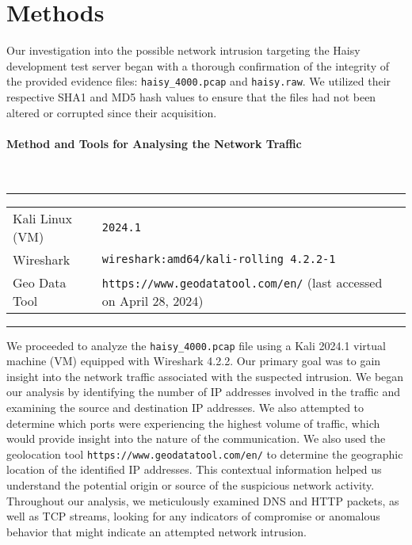 \section{Methods}
Our investigation into the possible network intrusion targeting the Haisy development test server began with a thorough confirmation of the integrity of the provided evidence files: \texttt{haisy\_4000.pcap} and \texttt{haisy.raw}. We utilized their respective SHA1 and MD5 hash values to ensure that the files had not been altered or corrupted since their acquisition.

\paragraph{Method and Tools for Analysing the Network Traffic}\mbox{}\\
\noindent\rule{\textwidth}{1pt}
\vspace{-0.8cm}
\begin{table}[h]
\begin{tabular}{ll}
Kali Linux (VM) & \texttt{2024.1}                                 \\
Wireshark      & \texttt{wireshark:amd64/kali-rolling 4.2.2-1} \\
Geo Data Tool   & \texttt{https://www.geodatatool.com/en/}  (last accessed on April 28, 2024)
\end{tabular}
\end{table}

\vspace{-0.8cm}
\noindent\rule{\textwidth}{1pt}
\vspace{-0.3cm}

\noindent We proceeded to analyze the \texttt{haisy\_4000.pcap} file using a Kali 2024.1 virtual machine (VM) equipped with Wireshark 4.2.2. Our primary goal was to gain insight into the network traffic associated with the suspected intrusion. We began our analysis by identifying the number of IP addresses involved in the traffic and examining the source and destination IP addresses. We also attempted to determine which ports were experiencing the highest volume of traffic, which would provide insight into the nature of the communication. We also used the geolocation tool \texttt{https://www.geodatatool.com/en/} to determine the geographic location of the identified IP addresses. This contextual information helped us understand the potential origin or source of the suspicious network activity. Throughout our analysis, we meticulously examined DNS and HTTP packets, as well as TCP streams, looking for any indicators of compromise or anomalous behavior that might indicate an attempted network intrusion.

